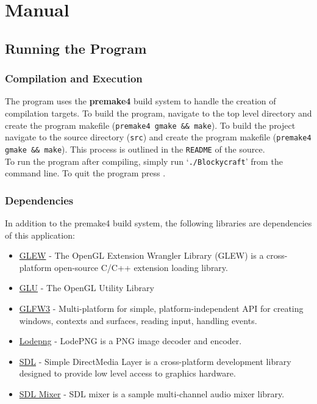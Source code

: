 \documentclass{book}
\begin{document}
\chapter{Manual}
\section{Running the Program}
\subsection{Compilation and Execution}
The program uses the \textbf{premake4} build system to handle the creation of compilation targets.  To build the program, navigate to the top level directory and create the program makefile (\texttt{premake4 gmake \&\& make}).  To build the project navigate to the source directory (\texttt{src}) and create the program makefile (\texttt{premake4 gmake \&\& make}).
This process is outlined in the \texttt{README} of the source.
\\
To run the program after compiling, simply run `\texttt{./Blockycraft}' from the command line.  To quit the program press .

\subsection{Dependencies}
In addition to the premake4 build system, the following libraries are dependencies of this application: 
\begin{itemize}
	\item \href{https://github.com/nigels-com/glew}{GLEW} - The OpenGL Extension Wrangler Library (GLEW) is a cross-platform open-source C/C++ extension loading library.
	\item \href{https://www.opengl.org/resources/libraries/}{GLU} - The OpenGL Utility Library
	\item \href{http://www.glfw.org/docs/latest/}{GLFW3} - Multi-platform for simple, platform-independent API for creating windows, contexts and surfaces, reading input, handling events.
	\item \href{http://lodev.org/lodepng/}{Lodepng} - LodePNG is a PNG image decoder and encoder.
	\item \href{https://www.libsdl.org/}{SDL} - Simple DirectMedia Layer is a cross-platform development library designed to provide low level access to graphics hardware.
	\item \href{https://www.libsdl.org/projects/SDL_mixer/}{SDL Mixer} - SDL mixer is a sample multi-channel audio mixer library. 
\end{itemize}
\end{document}
